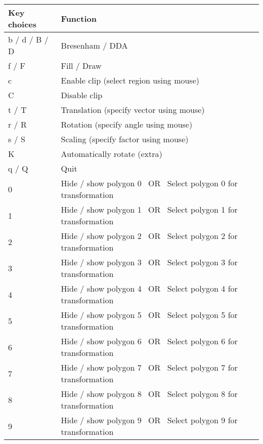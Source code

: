 \documentclass[11pt]{article}
\begin{document}
\newcommand{\keyboard}[1]{
	Hide / show polygon #1 \  OR \  Select polygon #1 for transformation
}

\begin{tabular}{ | l | l | }\hline
Key choices		& Function \\ \hline
b / d / B / D	& Bresenham / DDA \\ \hline
f / F			& Fill / Draw \\ \hline
c				& Enable clip (select region using mouse) \\ \hline
C				& Disable clip \\ \hline
t / T			& Translation (specify vector using mouse) \\ \hline
r / R			& Rotation (specify angle using mouse) \\ \hline
s / S			& Scaling (specify factor using mouse) \\ \hline
K				& Automatically rotate (extra) \\ \hline
q / Q			& Quit \\ \hline
0				& \keyboard{0} \\ \hline
1				& \keyboard{1} \\ \hline
2				& \keyboard{2} \\ \hline
3				& \keyboard{3} \\ \hline
4				& \keyboard{4} \\ \hline
5				& \keyboard{5} \\ \hline
6				& \keyboard{6} \\ \hline
7				& \keyboard{7} \\ \hline
8				& \keyboard{8} \\ \hline
9				& \keyboard{9} \\ \hline
\end{tabular}
\end{document}
